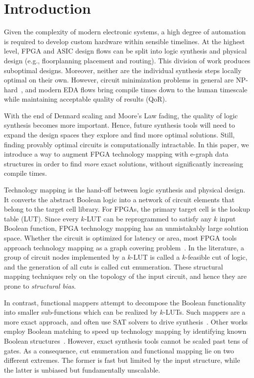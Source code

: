 \section{Introduction}\label{sec:intro}
Given the complexity of modern electronic systems, a high degree of automation
is required to develop custom hardware within sensible timelines. At the
highest level, FPGA and ASIC design flows can be split into logic synthesis and
physical design (e.g., floorplanning placement and routing). This division of
work produces suboptimal designs. Moreover, neither are the individual
synthesis steps locally optimal on their own. However, circuit minimization
problems in general are NP-hard~\cite{logicmin,twolevellogic}, and modern EDA
flows bring compile times down to the human timescale while maintaining
acceptable quality of results (QoR).

With the end of Dennard scaling and Moore's Law fading, the quality of logic
synthesis becomes more important. Hence, future synthesis tools will need to
expand the design spaces they explore and find more optimal solutions. Still,
finding provably optimal circuits is computationally intractable. In this
paper, we introduce a way to augment FPGA technology mapping with e-graph data
structures in order to find \textit{more} exact solutions, without
significantly increasing compile times.

Technology mapping is the hand-off between logic synthesis and physical design.
It converts the abstract Boolean logic into a network of circuit elements that
belong to the target cell library. For FPGAs, the primary target cell is the
lookup table (LUT). Since every $k$-LUT can be reprogrammed to satisfy any $k$
input Boolean function, FPGA technology mapping has an unmistakably large
solution space. Whether the circuit is optimized for latency or area, most FPGA
tools approach technology mapping as a graph covering problem~\cite{flowmap,
    daomap, attmap, imap}. In the literature, a group of circuit nodes implemented
by a $k$-LUT is called a $k$-feasible cut of logic, and the generation of all
cuts is called cut enumeration. These structural mapping techniques rely on the
topology of the input circuit, and hence they are prone to \textit{structural
    bias}.

In contrast, functional mappers attempt to decompose the Boolean functionality
into smaller sub-functions which can be realized by $k$-LUTs. Such mappers are
a more exact approach, and often use SAT solvers to drive
synthesis~\cite{satmap,satmap2}. Other works employ Boolean matching to speed
up technology mapping by identifying known Boolean
structures~\cite{boolmatch,fastboolmatch}. However, exact synthesis tools
cannot be scaled past tens of gates. As a consequence, cut enumeration and
functional mapping lie on two different extremes. The former is fast but
limited by the input structure, while the latter is unbiased but fundamentally
unscalable.

